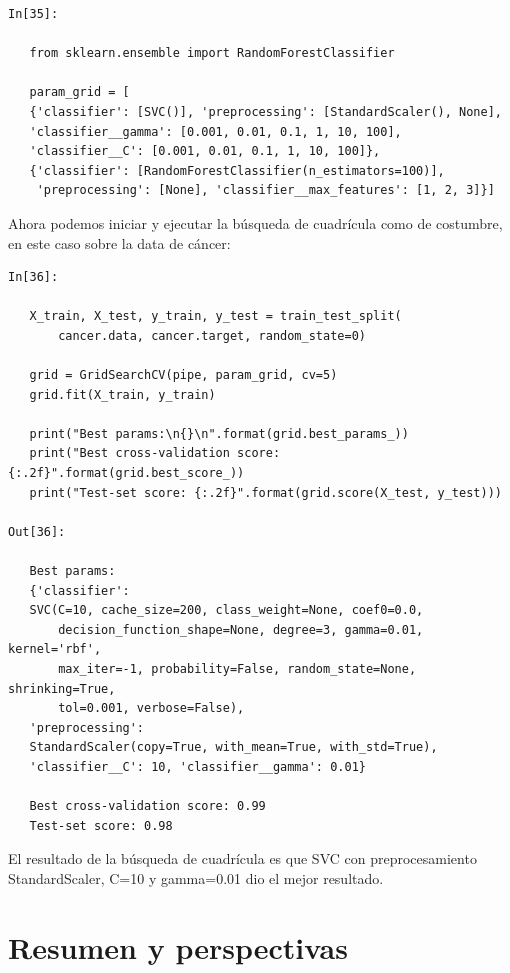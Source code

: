 	\begin{lstlisting}   
In[35]:
   
   from sklearn.ensemble import RandomForestClassifier
   
   param_grid = [
   {'classifier': [SVC()], 'preprocessing': [StandardScaler(), None],
   'classifier__gamma': [0.001, 0.01, 0.1, 1, 10, 100],
   'classifier__C': [0.001, 0.01, 0.1, 1, 10, 100]},
   {'classifier': [RandomForestClassifier(n_estimators=100)],
    'preprocessing': [None], 'classifier__max_features': [1, 2, 3]}]	
	\end{lstlisting}
	
Ahora podemos iniciar y ejecutar la búsqueda de cuadrícula como de costumbre, 
	en este caso sobre la data de cáncer:
	
	\begin{lstlisting}	
In[36]:
	
   X_train, X_test, y_train, y_test = train_test_split(
       cancer.data, cancer.target, random_state=0)
   
   grid = GridSearchCV(pipe, param_grid, cv=5)
   grid.fit(X_train, y_train)
   
   print("Best params:\n{}\n".format(grid.best_params_))
   print("Best cross-validation score: {:.2f}".format(grid.best_score_))
   print("Test-set score: {:.2f}".format(grid.score(X_test, y_test)))
	
Out[36]:
	
   Best params:
   {'classifier':
   SVC(C=10, cache_size=200, class_weight=None, coef0=0.0,
       decision_function_shape=None, degree=3, gamma=0.01, kernel='rbf',
       max_iter=-1, probability=False, random_state=None, shrinking=True,
       tol=0.001, verbose=False),
   'preprocessing':
   StandardScaler(copy=True, with_mean=True, with_std=True),
   'classifier__C': 10, 'classifier__gamma': 0.01}
   
   Best cross-validation score: 0.99
   Test-set score: 0.98	
	\end{lstlisting}
	
	
	El resultado de la búsqueda de cuadrícula es que {\ttfamily SVC} con preprocesamiento {\ttfamily StandardScaler}, {\ttfamily C=10}  y {\ttfamily  gamma=0.01} dio el mejor resultado.
	
	
	\section{Resumen y perspectivas}
	
